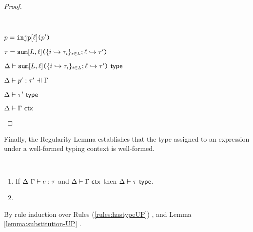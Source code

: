 \begin{grayparbox}
\begin{proof}
\begin{byCases}
\item[\text{(\ref{rule:patType-inj})}] ~
\begin{pfsteps*}
  \item $p=\texttt{injp}[\ell]\texttt{(}p'\texttt{)}$ 
  \item $\tau=\texttt{sum}[L, \ell]\texttt{(}\{i \hookrightarrow \tau_{i}\}_{i \in L}; \ell \hookrightarrow \tau'\texttt{)}$ 
  \item $\Delta \vdash \texttt{sum}[L, \ell]\texttt{(}\{i \hookrightarrow \tau_{i}\}_{i \in L}; \ell \hookrightarrow \tau'\texttt{)}~\mathsf{type}$  
  \item $\patType{\pctx}{p'}{\tau'}$  
  \item $\Delta \vdash \tau'~\mathsf{type}$   
  \item $\Delta \vdash \Gamma~\mathsf{ctx}$ 
\end{pfsteps*}
\resetpfcounter
\end{byCases}
\end{proof}
\end{grayparbox}

Finally, the Regularity Lemma establishes that the type assigned to an expression under a well-formed typing context is well-formed. 
\begin{lemma}[Regularity]\label{lemma:regularity-UP} ~
\begin{enumerate}
\item If $\Delta~\Gamma \vdash e : \tau$ and $\Delta \vdash \Gamma~\mathsf{ctx}$ then $\Delta \vdash \tau~\mathsf{type}$.
\item {}
\end{enumerate}
\end{lemma}
\begin{proof-sketch} By  rule induction over Rules (\ref{rules:hastypeUP}) , and Lemma \ref{lemma:substitution-UP} .
\end{proof-sketch}

